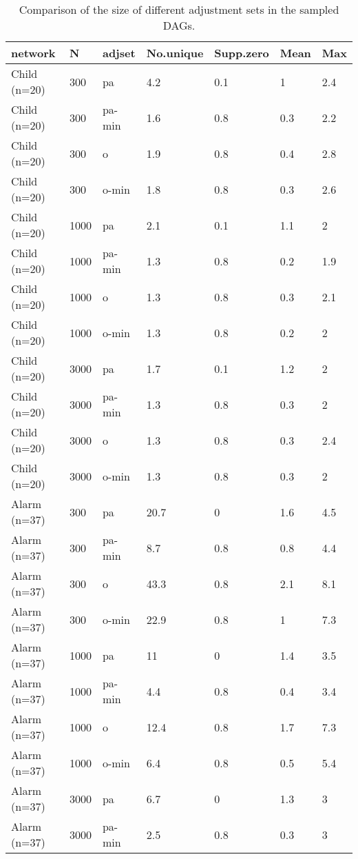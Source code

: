 \begin{table}[h]
\centering
\caption[Averaged over every cause-effect pair and over 30 data sets independently sampled from each network.]{Comparison of the size of different adjustment sets in the sampled DAGs.} 
\label{tab::adjsetsize_small}
\begingroup\footnotesize
\begin{tabular}{lllllll}
  \hline
network & N & adjset & No.unique & Supp.zero & Mean & Max \\ 
  \hline
Child (n=20) & 300 & pa & 4.2 & 0.1 & 1 & 2.4 \\ 
  Child (n=20) & 300 & pa-min & 1.6 & 0.8 & 0.3 & 2.2 \\ 
  Child (n=20) & 300 & o & 1.9 & 0.8 & 0.4 & 2.8 \\ 
  Child (n=20) & 300 & o-min & 1.8 & 0.8 & 0.3 & 2.6 \\ 
  Child (n=20) & 1000 & pa & 2.1 & 0.1 & 1.1 & 2 \\ 
  Child (n=20) & 1000 & pa-min & 1.3 & 0.8 & 0.2 & 1.9 \\ 
  Child (n=20) & 1000 & o & 1.3 & 0.8 & 0.3 & 2.1 \\ 
  Child (n=20) & 1000 & o-min & 1.3 & 0.8 & 0.2 & 2 \\ 
  Child (n=20) & 3000 & pa & 1.7 & 0.1 & 1.2 & 2 \\ 
  Child (n=20) & 3000 & pa-min & 1.3 & 0.8 & 0.3 & 2 \\ 
  Child (n=20) & 3000 & o & 1.3 & 0.8 & 0.3 & 2.4 \\ 
  Child (n=20) & 3000 & o-min & 1.3 & 0.8 & 0.3 & 2 \\ 
  Alarm (n=37) & 300 & pa & 20.7 & 0 & 1.6 & 4.5 \\ 
  Alarm (n=37) & 300 & pa-min & 8.7 & 0.8 & 0.8 & 4.4 \\ 
  Alarm (n=37) & 300 & o & 43.3 & 0.8 & 2.1 & 8.1 \\ 
  Alarm (n=37) & 300 & o-min & 22.9 & 0.8 & 1 & 7.3 \\ 
  Alarm (n=37) & 1000 & pa & 11 & 0 & 1.4 & 3.5 \\ 
  Alarm (n=37) & 1000 & pa-min & 4.4 & 0.8 & 0.4 & 3.4 \\ 
  Alarm (n=37) & 1000 & o & 12.4 & 0.8 & 1.7 & 7.3 \\ 
  Alarm (n=37) & 1000 & o-min & 6.4 & 0.8 & 0.5 & 5.4 \\ 
  Alarm (n=37) & 3000 & pa & 6.7 & 0 & 1.3 & 3 \\ 
  Alarm (n=37) & 3000 & pa-min & 2.5 & 0.8 & 0.3 & 3 \\ 

\end{tabular}
\end{table}
